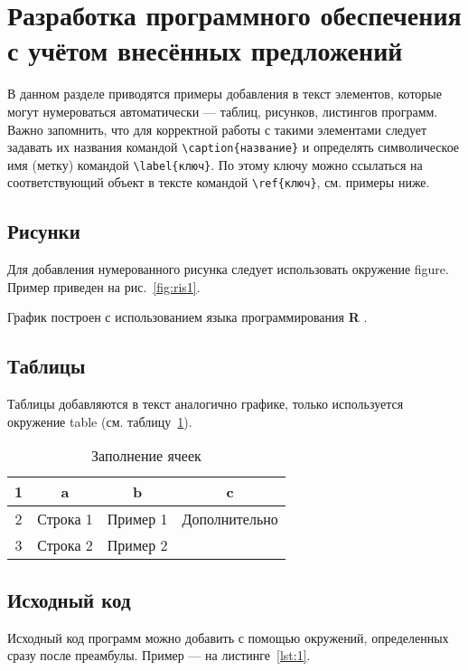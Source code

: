 
\section{Разработка программного обеспечения с учётом внесённых предложений}

В данном разделе приводятся примеры добавления в текст элементов, которые могут нумероваться автоматически --- таблиц, рисунков, листингов программ. Важно запомнить, что для корректной работы с такими элементами следует задавать их названия командой \Verb|\caption{название}| и определять символическое имя (метку) командой \Verb|\label{ключ}|. По этому ключу можно ссылаться на соответствующий объект в тексте командой \Verb|\ref{ключ}|, см. примеры ниже.

\subsection{Рисунки}

Для добавления нумерованного рисунка следует использовать окружение figure. Пример приведен на рис.~\ref{fig:ris1}.

График построен с использованием языка программирования \textbf{R} \cite{RManual}.

\subsection{Таблицы}

Таблицы добавляются в текст аналогично графике, только используется окружение table (см. таблицу~\ref{tab:tab1}).

\begin{table}[H]
\caption{Заполнение ячеек} \label{tab:tab1}
\centering
\begin{tabular}{|c|c|c|c|}
\hline 1 & a & b & c \\ 
\hline  2 & Строка 1 &Пример 1  & Дополнительно \\ 
\hline 3 &  Строка 2&  Пример 2&  \\ 
\hline 
\end{tabular} 
\end{table}

\subsection{Исходный код}

Исходный код программ можно добавить с помощью окружений, определенных сразу после преамбулы. Пример --- на листинге~\ref{lst:1}.


